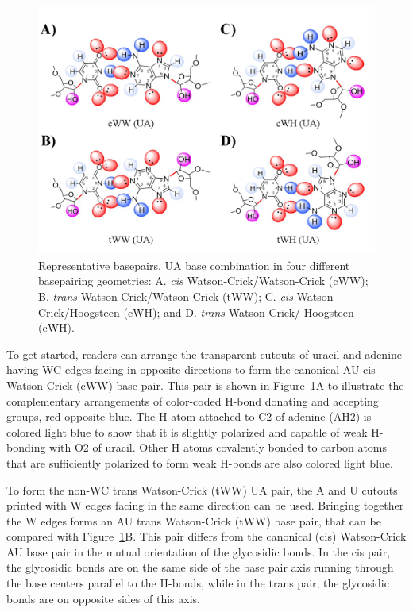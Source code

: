 \begin{figure}
  \includegraphics[width=\linewidth]{chapter-1/figs/basepairs}
  \caption{Representative basepairs. UA base combination in four different
    basepairing geometries: A. \emph{cis} Watson-Crick/Watson-Crick (cWW); B. \emph{trans}
    Watson-Crick/Watson-Crick (tWW); C. \emph{cis} Watson-Crick/Hoogsteen (cWH); and D.
  \emph{trans} Watson-Crick/ Hoogsteen (cWH).}
  \label{fig:basepairs}
\end{figure}

To get started, readers can arrange the transparent cutouts of uracil and
adenine having WC edges facing in opposite directions to form the canonical AU
cis Watson-Crick (cWW) base pair. This pair is shown in Figure~\ref{fig:basepairs}A to illustrate
the complementary arrangements of color-coded H-bond donating and accepting
groups, red opposite blue. The H-atom attached to C2 of adenine (AH2) is colored
light blue to show that it is slightly polarized and capable of weak H-bonding
with O2 of uracil. Other H atoms covalently bonded to carbon atoms that are
sufficiently polarized to form weak H-bonds are also colored light blue. 

To form the non-WC trans Watson-Crick (tWW) UA pair, the A and U cutouts printed
with W edges facing in the same direction can be used.  Bringing together the W
edges forms an AU trans Watson-Crick (tWW) base pair, that can be compared with
Figure~\ref{fig:basepairs}B. This pair differs from the canonical (cis) Watson-Crick AU base pair
in the mutual orientation of the glycosidic bonds. In the cis pair, the
glycosidic bonds are on the same side of the base pair axis running through the
base centers parallel to the H-bonds, while in the trans pair, the glycosidic
bonds are on opposite sides of this axis.  

